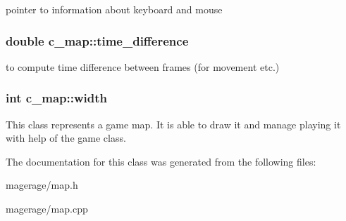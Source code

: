 pointer to information about keyboard and mouse \hypertarget{classc__map_a7a1d7aaf2dafa841ec84f9b6aa256b5b}{
\subsubsection[{time\-\_\-difference}]{\setlength{\rightskip}{0pt plus 5cm}double c\-\_\-map\-::time\-\_\-difference\hspace{0.3cm}{\ttfamily [protected]}}}\label{classc__map_a7a1d7aaf2dafa841ec84f9b6aa256b5b}
to compute time difference between frames (for movement etc.) \hypertarget{classc__map_a24f23160d66e61d5f6943cd4f51aa06f}{
\subsubsection[{width}]{\setlength{\rightskip}{0pt plus 5cm}int c\-\_\-map\-::width\hspace{0.3cm}{\ttfamily [protected]}}}\label{classc__map_a24f23160d66e61d5f6943cd4f51aa06f}
This class represents a game map. It is able to draw it and manage playing it with help of the game class. 

The documentation for this class was generated from the following files\-:\begin{DoxyCompactItemize}
\item 
magerage/map.\-h\item 
magerage/map.\-cpp\end{DoxyCompactItemize}
